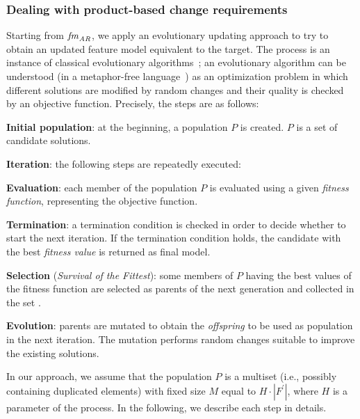 \begin{tikzborder}{\cite{Gargantini16:validation}}
\begin{tikzborder}{\cite{gargantini_combinatorial_2017}}
\begin{tikzborder}{\cite{garn2019}}
\begin{tikzborder}{\cite{arcaini2019achieving}}
	\subsubsection{Dealing with product-based change requirements}\label{sec:prodBasedChangeReqs}
	\bb
	Starting from $\mathit{fm}_{\mathit{AR}}$, we apply an evolutionary updating approach to try to obtain an updated feature model equivalent to the target. The process is an instance of classical evolutionary algorithms~\cite{Eiben2003}; an evolutionary algorithm can be understood (in a metaphor-free language~\cite{metaheuristicsMetaphor}) as an optimization problem in which different solutions are modified by random changes and their quality is checked by an objective function. Precisely, the steps are as follows:
	\begin{compactenum}
		\item \textbf{Initial population}: at the beginning, a population $P$ is created. $P$ is a set of candidate solutions.
		\item \textbf{Iteration}: the following steps are repeatedly executed:
		\begin{compactenum}
			\item \textbf{Evaluation}: each member of the population $P$ is evaluated using a given \emph{fitness function}, representing the objective function.
			\item \textbf{Termination}: a termination condition is checked in order to decide whether to start the next iteration. If the termination condition holds, the candidate with the best \emph{fitness value} is returned as final model.
			\item \textbf{Selection} (\emph{Survival of the Fittest}): some members of $P$ having the best values of the fitness function are selected as parents of the next generation and collected in the set \PAR.
			\item \textbf{Evolution}: parents \PAR are mutated to obtain the \emph{offspring} to be used as population in the next iteration. The mutation performs random changes suitable to improve the existing solutions.
		\end{compactenum}
	\end{compactenum}
	
	In our approach, we assume that the population $P$ is a multiset (i.e., possibly containing duplicated elements) with fixed size $M$ equal to $H \cdot |F^\prime|$, where $H$ is a parameter of the process. In the following, we describe each step in details.
	\be
	

\end{tikzborder}
\end{tikzborder}
\end{tikzborder}
\end{tikzborder}
